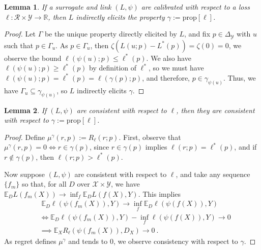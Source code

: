 \documentclass{article}
\newcommand{\reals}{\mathbb{R}}
\newcommand{\simplex}{\Delta_\Y}
\newcommand{\prop}[1]{\mathrm{prop}[#1]}
\newcommand{\E}{\mathbb{E}}
\newcommand{\R}{\mathcal{R}}
\newcommand{\X}{\mathcal{X}}
\newcommand{\Y}{\mathcal{Y}}
\newcommand{\risk}[1]{#1^*}
\newtheorem{lemma}{Lemma}
\begin{document}
\begin{lemma}\label{lem:calib-implies-indir}
	If a surrogate and link $(L, \psi)$ are calibrated with respect to a loss $\ell:\R \times\Y \to \reals$, then $L$ indirectly elicits the property $\gamma := \prop{\ell}$.
\end{lemma}
\begin{proof}
	Let $\Gamma$ be the unique property directly elicited by $L$, and fix $p \in \simplex$ with $u$ such that $p \in \Gamma_u$.
	As $p \in \Gamma_u$, then $\zeta(L(u;p) - \risk{L}(p)) = \zeta(0) = 0$, we observe the bound $\ell(\psi(u); p) \leq \risk{\ell}(p)$.
	We also have $\ell(\psi(u); p) \geq \risk{\ell}(p)$ by definition of $\risk{\ell}$, so we must have $\ell(\psi(u);p) = \risk{\ell}(p) = \ell(\gamma(p); p)$, and therefore, $p \in \gamma_{\psi(u)}$.
	Thus, we have $\Gamma_u \subseteq \gamma_{\psi(u)}$, so $L$ indirectly elicits $\gamma$.
\end{proof}

\begin{lemma}\label{lem:consistent-loss-implies-prop}
	If $(L, \psi)$ are consistent with respect to $\ell$, then they are consistent with respect to $\gamma := \prop{\ell}$.
\end{lemma}
\begin{proof}
	Define $\mu^\gamma(r, p) := R_\ell(r;p)$.
	First, observe that $\mu^\gamma(r,p) = 0 \iff r \in \gamma(p)$, since $r \in \gamma(p)$ implies $\ell(r;p) = \risk{\ell}(p)$, and if $r \not \in \gamma(p)$, then $\ell(r;p) > \risk{\ell}(p)$.
	
	Now suppose $(L, \psi)$ are consistent with respect to $\ell$, and take any sequence $\{f_m\}$ so that, for all $D$ over $\X \times \Y$, we have $\E_D L(f_m(X)) \to \inf_f \E_D L(f(X), Y)$.
	This implies 
	\begin{align*}
	&\; \E_D \ell(\psi(f_m(X)), Y)\to \inf_f \E_D \ell(\psi(f(X)), Y) \\
	&\iff \E_D \ell(\psi(f_m(X)), Y) - \inf_f \ell(\psi(f(X)), Y) \to 0 \\
	&\implies \E_X R_\ell(\psi(f_m(X)), D_X) \to 0~.~
	\end{align*}
	As regret defines $\mu^\gamma$ and tends to $0$, we observe consistency with respect to $\gamma$.
\end{proof}
\end{document}
